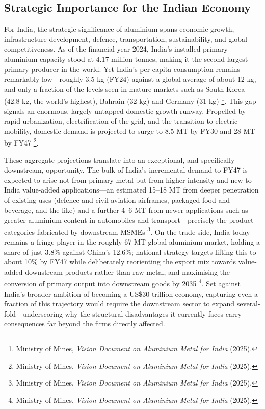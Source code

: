 \documentclass[11pt, a4paper]{article}
\numberwithin{figure}{section}
\numberwithin{table}{section}
\begin{document}
\subsection{Strategic Importance for the Indian Economy}
For India, the strategic significance of aluminium spans economic growth, infrastructure development, defence, transportation, sustainability, and global competitiveness. As of the financial year 2024, India's installed primary aluminium capacity stood at 4.17 million tonnes, making it the second-largest primary producer in the world. Yet India's per capita consumption remains remarkably low---roughly 3.5 kg (FY24) against a global average of about 12 kg, and only a fraction of the levels seen in mature markets such as South Korea (42.8 kg, the world's highest), Bahrain (32 kg) and Germany (31 kg) \cite{mom_vision2025}\footnote{Ministry of Mines, \textit{Vision Document on Aluminium Metal for India} (2025).}. This gap signals an enormous, largely untapped domestic growth runway. Propelled by rapid urbanization, electrification of the grid, and the transition to electric mobility, domestic demand is projected to surge to 8.5 MT by FY30 and 28 MT by FY47 \cite{mom_vision2025}\footnote{Ministry of Mines, \textit{Vision Document on Aluminium Metal for India} (2025).}.

These aggregate projections translate into an exceptional, and specifically downstream, opportunity. The bulk of India's incremental demand to FY47 is expected to arise not from primary metal but from higher-intensity and new-to-India value-added applications---an estimated 15--18 MT from deeper penetration of existing uses (defence and civil-aviation airframes, packaged food and beverage, and the like) and a further 4--6 MT from newer applications such as greater aluminium content in automobiles and transport---precisely the product categories fabricated by downstream MSMEs \cite{mom_vision2025}\footnote{Ministry of Mines, \textit{Vision Document on Aluminium Metal for India} (2025).}. On the trade side, India today remains a fringe player in the roughly 67 MT global aluminium market, holding a share of just 3.8\% against China's 12.6\%; national strategy targets lifting this to about 10\% by FY47 while deliberately reorienting the export mix towards value-added downstream products rather than raw metal, and maximising the conversion of primary output into downstream goods by 2035 \cite{mom_vision2025}\footnote{Ministry of Mines, \textit{Vision Document on Aluminium Metal for India} (2025).}. Set against India's broader ambition of becoming a US\$30 trillion economy, capturing even a fraction of this trajectory would require the downstream sector to expand several-fold---underscoring why the structural disadvantages it currently faces carry consequences far beyond the firms directly affected.
\end{document}
